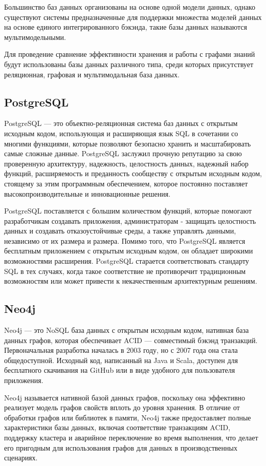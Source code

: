 Большинство баз данных организованы на основе одной модели данных, однако существуют системы предназначенные для поддержки множества моделей данных на основе единого интегрированного бэкэнда, такие базы данных называются мультимодельными.

Для проведение сравнение эффективности хранения и работы с графами знаний будут использованы базы данных различного типа, среди которых присутствует реляционная, графовая и мультимодальная база данных.

\subsection{PostgreSQL}

PostgreSQL — это объектно-реляционная система баз данных с открытым исходным кодом, использующая и расширяющая язык SQL в сочетании со многими функциями, которые позволяют безопасно хранить и масштабировать самые сложные данные. PostgreSQL заслужил прочную репутацию за свою проверенную архитектуру, надежность, целостность данных, надежный набор функций, расширяемость и преданность сообществу с открытым исходным кодом, стоящему за этим программным обеспечением, которое постоянно поставляет высокопроизводительные и инновационные решения.

PostgreSQL поставляется с большим количеством функций, которые помогают разработчикам создавать приложения, администраторам - защищать целостность данных и создавать отказоустойчивые среды, а также управлять данными, независимо от их размера и размера. Помимо того, что PostgreSQL является бесплатным приложением с открытым исходным кодом, он обладает широкими возможностями расширения. PostgreSQL старается соответствовать стандарту SQL в тех случаях, когда такое соответствие не противоречит традиционным возможностям или может привести к некачественным архитектурным решениям.

\subsection{Neo4j}

Neo4j — это NoSQL база данных с открытым исходным кодом, нативная база данных графов, которая обеспечивает ACID — совместимый бэкэнд транзакций. Первоначальная разработка началась в 2003 году, но с 2007 года она стала общедоступной. Исходный код, написанный на Java и Scala, доступен для бесплатного скачивания на GitHub или в виде удобного для пользователя приложения.

Neo4j называется нативной базой данных графов, поскольку она эффективно реализует модель графов свойств вплоть до уровня хранения. В отличие от обработки графов или библиотек в памяти, Neo4j также предоставляет полные характеристики базы данных, включая соответствие транзакциям ACID, поддержку кластера и аварийное переключение во время выполнения, что делает его пригодным для использования графов для данных в производственных сценариях.

